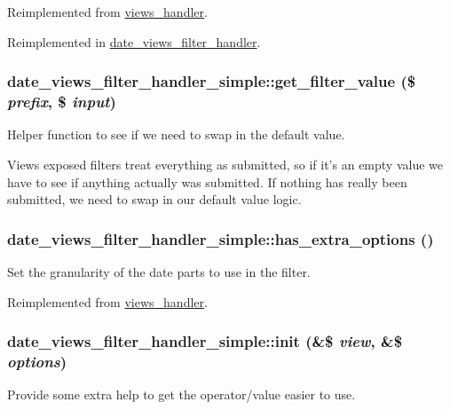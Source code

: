 Reimplemented from \hyperlink{classviews__handler_a8a2c2fb295ec8024fc9e33361a92e8ac}{views\_\-handler}.

Reimplemented in \hyperlink{classdate__views__filter__handler_af9d27a5bd6a2c0fe3c81327daf5ef45e}{date\_\-views\_\-filter\_\-handler}.\hypertarget{classdate__views__filter__handler__simple_ae36b57d4f13b4d13a6e3460cf8481720}{
\subsubsection[{get\_\-filter\_\-value}]{\setlength{\rightskip}{0pt plus 5cm}date\_\-views\_\-filter\_\-handler\_\-simple::get\_\-filter\_\-value (\$ {\em prefix}, \/  \$ {\em input})}}
\label{classdate__views__filter__handler__simple_ae36b57d4f13b4d13a6e3460cf8481720}
Helper function to see if we need to swap in the default value.

Views exposed filters treat everything as submitted, so if it's an empty value we have to see if anything actually was submitted. If nothing has really been submitted, we need to swap in our default value logic. \hypertarget{classdate__views__filter__handler__simple_ad1e692e5222cc417dcd83cdbdac1a270}{
\subsubsection[{has\_\-extra\_\-options}]{\setlength{\rightskip}{0pt plus 5cm}date\_\-views\_\-filter\_\-handler\_\-simple::has\_\-extra\_\-options ()}}
\label{classdate__views__filter__handler__simple_ad1e692e5222cc417dcd83cdbdac1a270}
Set the granularity of the date parts to use in the filter. 

Reimplemented from \hyperlink{classviews__handler_a10d35469346efc352d21e5f44de60b2e}{views\_\-handler}.\hypertarget{classdate__views__filter__handler__simple_ad88e187cbc6c8f5a48f4ad9daf83fff8}{
\subsubsection[{init}]{\setlength{\rightskip}{0pt plus 5cm}date\_\-views\_\-filter\_\-handler\_\-simple::init (\&\$ {\em view}, \/  \&\$ {\em options})}}
\label{classdate__views__filter__handler__simple_ad88e187cbc6c8f5a48f4ad9daf83fff8}
Provide some extra help to get the operator/value easier to use.

